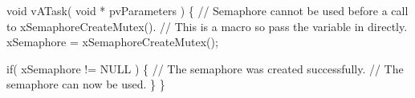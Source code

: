 \begin{DoxyPre}void vATask( void * pvParameters )
\{
   // Semaphore cannot be used before a call to xSemaphoreCreateMutex().
   // This is a macro so pass the variable in directly.
   xSemaphore = xSemaphoreCreateMutex();\end{DoxyPre}



\begin{DoxyPre}   if( xSemaphore != NULL )
   \{
       // The semaphore was created successfully.
       // The semaphore can now be used.
   \}
\}
\end{DoxyPre}
 